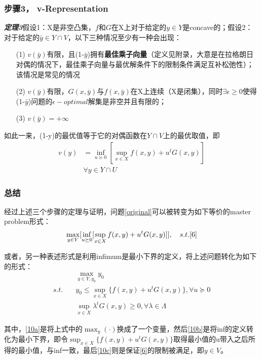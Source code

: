 \documentclass[UTF8,a4]{article}
\begin{document}
\subsubsection{步骤3， v-Representation}
\textbf{\emph{定理3}}假设1：X是非空凸集，$f$和$G$在X上对于给定的$y\in Y$是concave的；假设2：对于给定的$\bar{y}\in Y\cap V$，以下三种情况至少有一种会出现：
\begin{itemize}
\item[(1)]$v(\bar{y})$有限，且(1-$\bar{y}$)拥有\textbf{最佳乘子向量}（定义见附录，大意是在拉格朗日对偶的情况下，最佳乘子向量与最优解条件下的限制条件满足互补松弛性）；该情况是常见的情况
\item[(2)]$v(\bar{y})$有限，$G(x,\bar{y})$与$f(x,\bar{y})$在X上连续（X是闭集），同时$\exists \epsilon\geqslant 0$使得(1-$\bar{y}$)问题的$\epsilon-optimal$解集是非空并且有限的；
\item[(3)]$v(\bar{y})=+\infty$
\end{itemize}
如此一来，(1-y)的最优值等于它的对偶函数在$Y\cap V$上的最优取值，即
\begin{equation}
\label{9}
\begin{split}
v(y)&=\inf_{u\succeq0}[\sup_{x\in X}f(x,y)+u^tG(x,y)]\\
&\forall y\in Y\cap U
\end{split}
\end{equation}
\subsubsection{总结}
经过上述三个步骤的定理与证明，问题\eqref{original}可以被转变为如下等价的master problem形式：
$$
\max_{y\in Y}[\inf_{u\succeq0}[\sup_{x\in X}f(x,y)+u^tG(x,y)]],\quad s.t. \eqref{6}
$$

或者，另一种表述形式是利用infimum是最小下界的定义，将上述问题转化为如下的形式：
\begin{subequations}
\label{10}
\begin{align}
\label{10a}
&\max_{y\in Y,y_0}y_0\\
\label{10b}
s.t.\quad &y_0\leqslant\sup_{x\in X}\{f(x,y)+u^tG(x,y)\},\forall u\succeq0\\
\label{10c}
&\sup_{x\in X}{\lambda^tG(x,y)}\geqslant0, \forall\lambda\in\Lambda
\end{align}
\end{subequations}

其中，\eqref{10a}是将上式中的$\max_{y}(\cdot)$换成了一个变量，然后\eqref{10b}是将inf的定义转化为最小下界，即令$\sup_{x\in X}\{f(x,y)+u^tG(x,y)\}$取得最小值的u带入之后所得的最小值，与inf一致，最后\eqref{10c}则是保证\eqref{6}的限制被满足，即$y\in V$。
\end{document}
